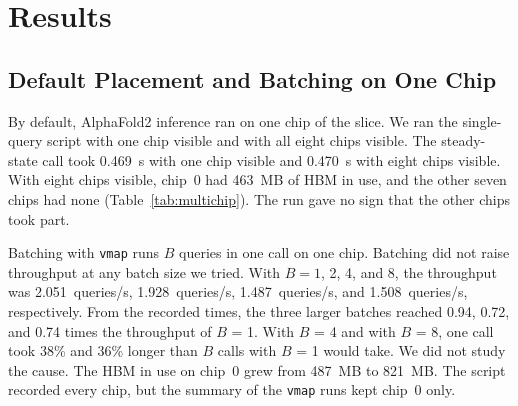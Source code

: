 \section{Results}\label{sec:results}

\subsection{Default Placement and Batching on One Chip}\label{sec:res-default}
\begin{table}[t]
\caption{\capTabMultichip}\label{tab:multichip}
\centering\small\setlength{\tabcolsep}{4pt}
\end{table}

By default, AlphaFold2 inference ran on one chip of the slice. We ran the single-query script with one chip visible and
with all eight chips visible.
The steady-state call took 0.469~s with one chip visible and 0.470~s with eight chips visible. %
With eight chips visible, chip~0 had 463~MB of HBM in use, and the other seven chips had none (Table~\ref{tab:multichip}). %
The run gave no sign that the other chips took part.

Batching with \texttt{vmap} runs $B$ queries in one call on one chip. Batching did not raise throughput at any batch size
we tried.
With $B = 1$, 2, 4, and 8, the throughput was 2.051~queries/s, 1.928~queries/s, 1.487~queries/s, and 1.508~queries/s, respectively. %
From the recorded times, the three larger batches reached 0.94, 0.72, and 0.74 times the throughput of $B$ = 1. %
With $B$ = 4 and with $B$ = 8, one call took 38\% and 36\% longer than $B$ calls with $B$ = 1 would take. We did not study the cause. %
The HBM in use on chip~0 grew from 487~MB to 821~MB. The script recorded every chip, but the summary of the \texttt{vmap} runs kept chip~0 only. %

